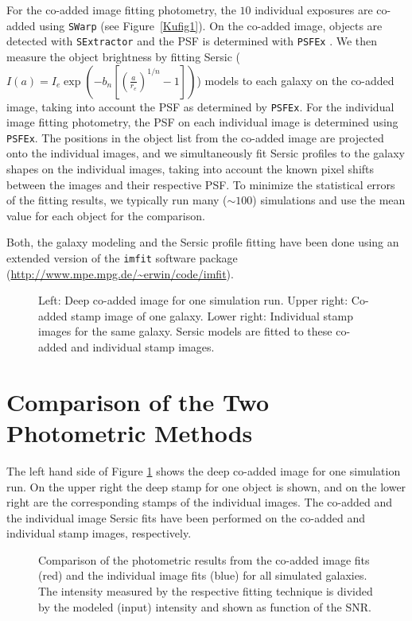 For the co-added image fitting photometry, the $10$ individual exposures are co-added using {\tt {}SWarp} (see Figure~\ref{Kufig1}). On the co-added image, objects are detected with {\tt {}SExtractor}  and the PSF is determined with {\tt PSFEx} \citep{2011ASPC..442..435B}. We then measure the object brightness by fitting Sersic ($I(a) = I_e \exp(-b_n[(\frac{a}{r_e})^{1/n}-1])$) models to each galaxy on the co-added image, taking into account the PSF as determined by {\tt PSFEx}. For the individual image fitting photometry, the PSF on each individual image is determined using {\tt PSFEx}. The positions in the object list from the co-added image are projected onto the individual images, and we simultaneously fit Sersic profiles to the galaxy shapes on the individual images, taking into account the known pixel shifts between the images and their respective PSF. To minimize the statistical errors of the fitting results, we typically run many ($\sim100$) simulations and use the mean value for each object for the comparison.

Both, the galaxy modeling and the Sersic profile fitting have been done using an extended version of the {\tt imfit} software package (\url{http://www.mpe.mpg.de/~erwin/code/imfit}). 
\begin{figure}[t]
\caption{Left: Deep co-added image for one simulation run. Upper right: Co-added stamp image of one galaxy. Lower right: Individual stamp images for the same galaxy. Sersic models are fitted to these co-added and individual stamp images.}
\label{fig2}
\end{figure}

\section{Comparison of the Two Photometric Methods}
The left hand side of Figure \ref{fig2} shows the deep co-added image for one simulation run. On the upper right the deep stamp for one object is shown, and on the lower right are the corresponding stamps of the individual images. The co-added and the individual image Sersic fits have been performed on the co-added and individual stamp images, respectively.
\begin{figure}[t]
\caption{Comparison of the photometric results from the co-added image fits (red) and the individual image fits (blue) for all simulated galaxies. The intensity measured by the respective fitting technique is divided by the modeled (input) intensity and shown as function of the SNR.}
\label{fig3}
\end{figure}

